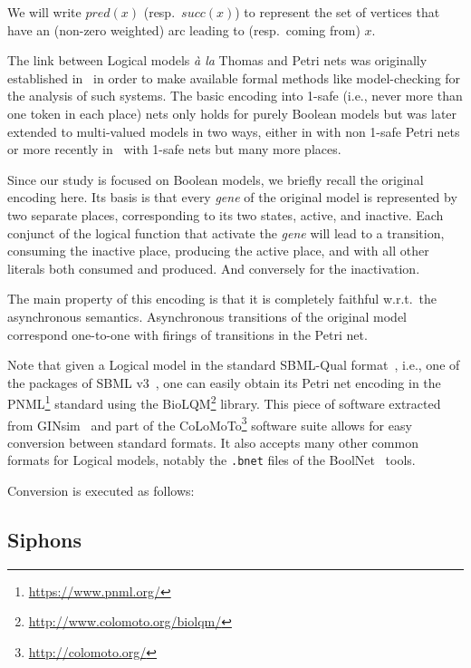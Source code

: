 \documentclass[runningheads]{llncs}
\begin{document}
We will write \(pred(x)\) (resp.\ \(succ(x)\)) to represent the set of vertices that have an (non-zero weighted) arc leading to (resp.\ coming from) \(x\).

The link between Logical models \emph{à la} Thomas and Petri nets was originally established in~\cite{chaouiya2004qualitative} in order to make available formal methods like model-checking for the analysis of such systems.
The basic encoding into 1-safe (i.e., never more than one token in each place) nets only holds for purely Boolean models but was later extended to multi-valued models in two ways, either in \cite{chaouiya2011petri} with non 1-safe Petri nets or more recently in~\cite{chatain2014characterization} with 1-safe nets but many more places.

Since our study is focused on Boolean models, we briefly recall the original encoding here.
Its basis is that every \emph{gene} of the original model is represented by two separate places, corresponding to its two states, active, and inactive.
Each conjunct of the logical function that activate the \emph{gene} will lead to a transition, consuming the inactive place, producing the active place, and with all other literals both consumed and produced.
And conversely for the inactivation.

The main property of this encoding is that it is completely faithful w.r.t.\ the asynchronous semantics.
Asynchronous transitions of the original model correspond one-to-one with firings of transitions in the Petri net.


Note that given a Logical model in the standard SBML-Qual format~\cite{chaouiya2013sbml}, i.e., one of the packages of SBML v3~\cite{keating2020sbml}, one can easily obtain its Petri net encoding in the PNML\footnote{\url{https://www.pnml.org/}} standard using the BioLQM\footnote{\url{http://www.colomoto.org/biolqm/}} library.
This piece of software extracted from GINsim~\cite{chaouiya2012logical} and part of the CoLoMoTo\footnote{\url{http://colomoto.org/}} software suite allows for easy conversion between standard formats.
It also accepts many other common formats for Logical models, notably the \verb|.bnet| files of the  BoolNet~\cite{mussel2010boolnet,klarner2017pyboolnet} tools.

Conversion is executed as follows:


\subsection{Siphons}
\end{document}
